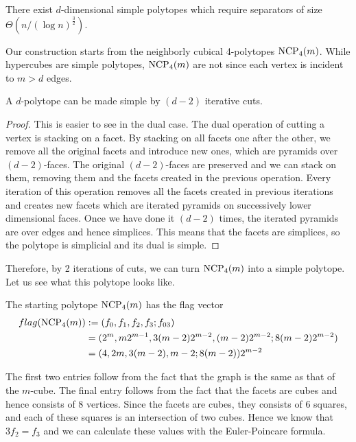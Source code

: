 \begin{theorem}
 There exist $d$-dimensional simple polytopes which require separators of size 
$\Theta(n/(\log n)^{\frac{3}{2}})$.
\end{theorem}

Our construction starts from the neighborly cubical 4-polytopes $\textrm{NCP}_4(m)$. 
While hypercubes are simple polytopes, $\textrm{NCP}_4(m)$ are not since each vertex is 
incident to $m>d$ edges. 

\begin{lemma}
 A $d$-polytope can be made simple by $(d-2)$ iterative cuts.
\end{lemma}

\begin{proof}
This is easier to see in the dual case. The dual operation of cutting a vertex 
is stacking on a facet. By stacking on all facets one after the other, we 
remove all the original facets and introduce new ones, which are pyramids over 
$(d-2)$-faces. The original $(d-2)$-faces are preserved and we can stack on 
them, removing them and the facets created in the previous operation. Every 
iteration of this operation removes all the facets created in previous 
iterations and creates new facets which are iterated pyramids on successively 
lower dimensional faces. Once we have done it $(d-2)$ times, the iterated 
pyramids are over edges and hence simplices. This means that the facets are 
simplices, so the polytope is simplicial and its dual is simple.
\end{proof}

Therefore, by 2 iterations of cuts, we can turn $\textrm{NCP}_4(m)$ into a simple 
polytope. Let us see what this polytope looks like. 

The starting polytope $\textrm{NCP}_4(m)$ has the flag vector 
\begin{align}
 flag(\textrm{NCP}_4(m)) &:= (f_0, f_1, f_2, f_3; f_{03}) \\
	&= (2^m, m2^{m-1}, 3(m-2)2^{m-2}, (m-2)2^{m-2}; 8(m-2)2^{m-2}) \\
	&= (4, 2m, 3(m-2), m-2; 8(m-2))2^{m-2}
\end{align}

The first two entries follow from the fact that the graph is the same as that 
of the $m$-cube. The final entry follows from the fact that the facets are 
cubes and hence consists of 8 vertices. Since the facets are cubes, they 
consists of 6 squares, and each of these squares is an intersection of two 
cubes. Hence we know that $3f_2 = f_3$ and we can calculate these values with 
the Euler-Poincare formula.

